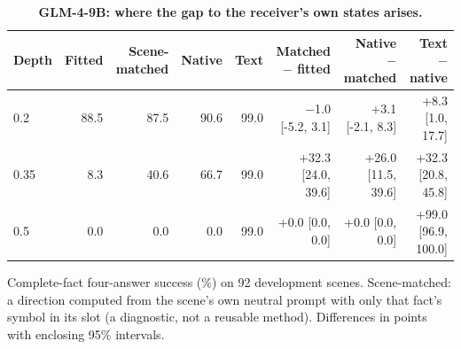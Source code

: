 \begin{table}[!htbp]
\caption{\textbf{GLM-4-9B: where the gap to the receiver's own states arises.}}
\label{tab:diag_d2}
\centering\footnotesize
\setlength{\tabcolsep}{2.5pt}
\begin{tabular*}{\linewidth}{@{\extracolsep{\fill}}lrrrrrrr@{}}
\toprule
Depth & Fitted & Scene-matched & Native & Text & Matched $-$ fitted & Native $-$ matched & Text $-$ native \\
\midrule
0.2 & 88.5 & 87.5 & 90.6 & 99.0 & $-$1.0 [-5.2, 3.1] & +3.1 [-2.1, 8.3] & +8.3 [1.0, 17.7] \\
0.35 & 8.3 & 40.6 & 66.7 & 99.0 & +32.3 [24.0, 39.6] & +26.0 [11.5, 39.6] & +32.3 [20.8, 45.8] \\
0.5 & 0.0 & 0.0 & 0.0 & 99.0 & +0.0 [0.0, 0.0] & +0.0 [0.0, 0.0] & +99.0 [96.9, 100.0] \\
\bottomrule
\end{tabular*}
\par\vspace{3pt}
{\footnotesize\raggedright Complete-fact four-answer success (\%) on 92 development scenes. Scene-matched: a direction computed from the scene's own neutral prompt with only that fact's symbol in its slot (a diagnostic, not a reusable method). Differences in points with enclosing 95\% intervals.\par}
\end{table}
